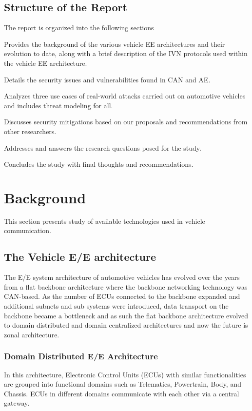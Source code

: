 \documentclass{report}
\begin{document}
\subsection{Structure of the Report}
The report is organized into the following sections

\begin{description}[leftmargin=!,labelwidth=\widthof{\bfseries Section 8:}]
    \item[Section 3:] Provides the background of the various vehicle EE architectures and their evolution to date, along with a brief description of the IVN protocols used within the vehicle EE architecture.
    \item[Section 4:] Details the security issues and vulnerabilities found in CAN and AE.
    \item[Section 5:] Analyzes three use cases of real-world attacks carried out on automotive vehicles and includes threat modeling for all.
    \item[Section 6:] Discusses security mitigations based on our proposals and recommendations from other researchers.
    \item[Section 7:] Addresses and answers the research questions posed for the study.
    \item[Section 8:] Concludes the study with final thoughts and recommendations.
\end{description}

\section{Background}
This section presents study of available technologies used in vehicle communication.\cite{kaiwartya2016internet}

\subsection{The Vehicle E/E architecture}
The E/E system architecture of automotive vehicles has evolved over the years from a flat backbone architecture where the backbone networking technology was CAN-based. As the number of ECUs connected to the backbone expanded and additional subnets and sub systems were introduced, data transport on the backbone became a bottleneck and as such the flat backbone architecture evolved to domain distributed and domain centralized architectures and now the future is zonal architecture.\cite{zerfowski2019functional}

\subsubsection{Domain Distributed E/E Architecture}
In this architecture, Electronic Control Units (ECUs) with similar functionalities are grouped into functional domains such as Telematics, Powertrain, Body, and Chassis. ECUs in different domains communicate with each other via a central gateway.
\end{document}

